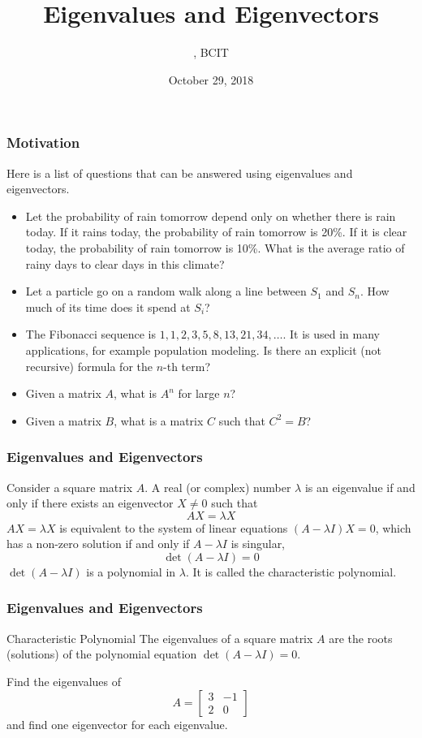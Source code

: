\documentclass[xcolor=dvipsnames]{beamer}
\title{Eigenvalues and Eigenvectors}
\subtitle{{\CourseNumber}, BCIT}
\author{\CourseName}
\date{October 29, 2018}
\begin{document}
\begin{frame}
  \titlepage
\end{frame}

\begin{frame}
  \frametitle{Motivation}
Here is a list of questions that can be answered using eigenvalues and
eigenvectors.
\begin{itemize}
\item Let the probability of rain tomorrow depend only on whether
  there is rain today. If it rains today, the probability of rain
  tomorrow is 20\%. If it is clear today, the probability of rain
  tomorrow is 10\%. What is the average ratio of rainy days to clear
  days in this climate?
\item Let a particle go on a random walk along a line between $S_{1}$
  and $S_{n}$. How much of its time does it spend at $S_{i}$?
\item The Fibonacci sequence is $1,1,2,3,5,8,13,21,34,{\ldots}$. It is
  used in many applications, for example population modeling. Is there
  an explicit (not recursive) formula for the $n$-th term?
\item Given a matrix $A$, what is $A^{n}$ for large $n$?
\item Given a matrix $B$, what is a matrix $C$ such that $C^{2}=B$?
\end{itemize}
\end{frame}

\begin{frame}
  \frametitle{Eigenvalues and Eigenvectors}
  Consider a square matrix $A$. A real (or complex) number $\lambda$
  is an \alert{eigenvalue} if and only if there exists an \alert{eigenvector}
  $X\neq{}0$ such that
  \begin{equation}
    \label{eq:raeshaez}
    AX=\lambda{}X
  \end{equation}
  $AX=\lambda{}X$ is equivalent to the system of linear equations
  $(A-\lambda{}I)X=0$, which has a non-zero solution if and only if
  $A-\lambda{}I$ is singular,
\begin{equation}
  \label{eq:aeshopae}
  \det(A-\lambda{}I)=0
\end{equation}
$\det(A-\lambda{}I)$ is a polynomial in $\lambda$. It is called the
\alert{characteristic polynomial}.
\end{frame}

\begin{frame}
  \frametitle{Eigenvalues and Eigenvectors}
  \begin{block}{Characteristic Polynomial}
    The eigenvalues of a square matrix $A$ are the roots (solutions)
    of the polynomial equation $\det(A-\lambda{}I)=0$.
  \end{block}

  \bigskip

  {\ubung} Find the eigenvalues of
  \begin{equation}
    \label{eq:neevicuo}
    A=\left[
      \begin{array}{cc}
        3&-1\\
        2&0
      \end{array}\right]
  \end{equation}
and find one eigenvector for each eigenvalue.
\end{frame}
\end{document}
